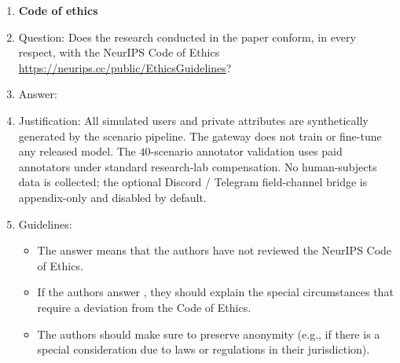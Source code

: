 \begin{enumerate}
\item {\bf Code of ethics}
    \item[] Question: Does the research conducted in the paper conform, in every respect, with the NeurIPS Code of Ethics \url{https://neurips.cc/public/EthicsGuidelines}?
    \item[] Answer: \answerYes{}
    \item[] Justification: All simulated users and private attributes are synthetically generated by the scenario pipeline. The gateway does not train or fine-tune any released model. The $40$-scenario annotator validation uses paid annotators under standard research-lab compensation. No human-subjects data is collected; the optional Discord / Telegram field-channel bridge is appendix-only and disabled by default.
    \item[] Guidelines:
    \begin{itemize}
        \item The answer \answerNA{} means that the authors have not reviewed the NeurIPS Code of Ethics.
        \item If the authors answer \answerNo, they should explain the special circumstances that require a deviation from the Code of Ethics.
        \item The authors should make sure to preserve anonymity (e.g., if there is a special consideration due to laws or regulations in their jurisdiction).
    \end{itemize}



\end{enumerate}
